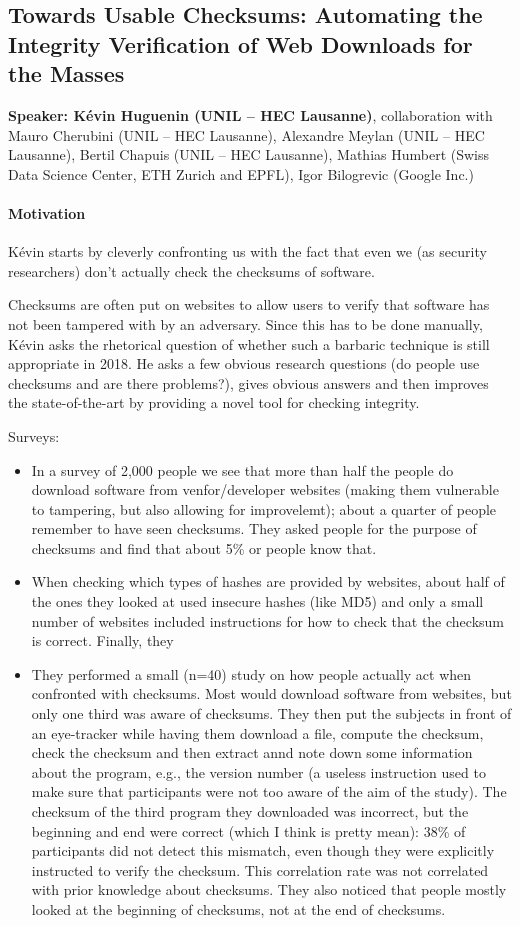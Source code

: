 \documentclass{article}
\begin{document}
\subsection{Towards Usable Checksums: Automating the Integrity Verification of Web Downloads for the Masses}
\noindent\textbf{Speaker: K\'evin Huguenin (UNIL – HEC Lausanne)}, collaboration with Mauro Cherubini (UNIL – HEC Lausanne), Alexandre Meylan (UNIL – HEC Lausanne), Bertil Chapuis (UNIL – HEC Lausanne), Mathias Humbert (Swiss Data Science Center, ETH Zurich and EPFL), Igor Bilogrevic (Google Inc.)

\paragraph{Motivation} K\'evin starts by cleverly confronting us with the fact that even we (as security researchers) don't actually check the checksums of software. 

Checksums are often put on websites to allow users to verify that software has not been tampered with by an adversary. Since this has to be done manually, K\'evin asks the rhetorical question of whether such a barbaric technique is still appropriate in 2018. He asks a few obvious research questions (do people use checksums and are there problems?), gives obvious answers and then improves the state-of-the-art by providing a novel tool for checking integrity.

Surveys:\begin{itemize}
\item In a survey of 2,000 people we see that more than half the people do download software from venfor/developer websites (making them vulnerable to tampering, but also allowing for improvelemt); about a quarter of people remember to have seen checksums. They asked people for the purpose of checksums and find that about 5\% or people know that.
\item When checking which types of hashes are provided by websites, about half of the ones they looked at used insecure hashes (like MD5) and only a small number of websites included instructions for how to check that the checksum is correct. Finally, they 
\item They performed a small (n=40) study on how people actually act when confronted with checksums. Most would download software from websites, but only one third was aware of checksums. They then put the subjects in front of an eye-tracker while having them download a file, compute the checksum, check the checksum and then extract annd note down some information about the program, e.g., the version number (a useless instruction used to make sure that participants were not too aware of the aim of the study). The checksum of the third program they downloaded was incorrect, but the beginning and end were correct (which I think is pretty mean): 38\% of participants did not detect this mismatch, even though they were explicitly instructed to verify the checksum. This correlation rate was not correlated with prior knowledge about checksums. They also noticed that people mostly looked at the beginning of checksums, not at the end of checksums.
\end{itemize}
\end{document}
